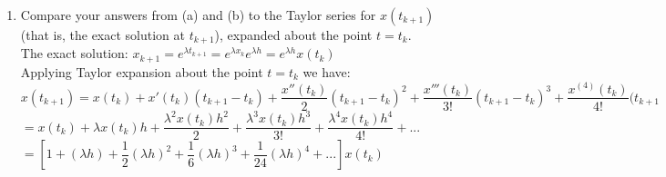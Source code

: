 \documentclass[14pt,a4paper]{article}
\begin{document}
\begin{enumerate}
	\label{1c}
	\item Compare your answers from (a) and (b) to the Taylor series for $x(t_{k+1})$ (that is, the exact solution at $t_{k+1}$), expanded about the point $t=t_k$.\\
	The exact solution: $x_{k+1} = e^{\lambda t_{k+1}} = e^{\lambda x_k}e^{\lambda h} = e^{\lambda h}x(t_k)$\\
	Applying Taylor expansion about the point $t = t_k$ we have:\\
	$x(t_{k+1}) = x(t_k) + x'(t_k)(t_{k+1}-t_k) + \dfrac{x''(t_k)}{2}(t_{k+1}-t_k)^2 + \dfrac{x'''(t_k)}{3!}(t_{k+1}-t_k)^3 + \dfrac{x^{(4)}(t_k)}{4!}(t_{k+1}$ \\%
	\hspace*{1.2cm} $= x(t_k) + \lambda x(t_k)h + \dfrac{\lambda^2x(t_k)h^2}{2} + \dfrac{\lambda^3x(t_k)h^3}{3!} + \dfrac{\lambda^4x(t_k)h^4}{4!} + ...$\\ 
	\hspace*{1.2cm}  $= \left[ 1 + (\lambda h) + \dfrac{1}{2}(\lambda h)^2 + \dfrac{1}{6}(\lambda h)^3 + \dfrac{1}{24}(\lambda h)^4 + ... \right]x(t_k)$\\
	

\end{enumerate}
\end{document}
